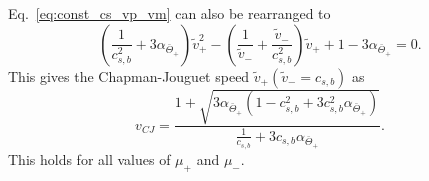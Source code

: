 Eq.~\eqref{eq:const_cs_vp_vm} can also be rearranged to
\begin{equation}
\left( \frac{1}{c_{s,b}^2} + 3\alpha_{\bar{\Theta}_+} \right) \tilde{v}_+^2
- \left( \frac{1}{\tilde{v}_-} + \frac{\tilde{v}_-}{c_{s,b}^2} \right) \tilde{v}_+
+ 1 - 3\alpha_{\bar{\Theta}_+}
= 0.
\end{equation}
This gives the Chapman-Jouguet speed $\tilde{v}_+ \left( \tilde{v}_- = c_{s,b} \right)$
as~\cite[eq. 55]{giese_2020}
\begin{equation}
v_{CJ} = \frac{ 1 + \sqrt{ 3\alpha_{\bar{\Theta}_+} ( 1 - c_{s,b}^2 + 3 c_{s,b}^2 \alpha_{\bar{\Theta}_+} ) }}{ \frac{1}{c_{s,b}} + 3 c_{s,b} \alpha_{\bar{\Theta}_+}}.
\end{equation}
This holds for all values of $\mu_+$ and $\mu_-$.
